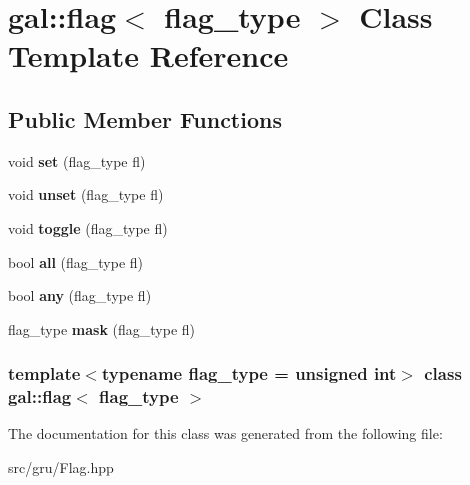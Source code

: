 \hypertarget{classgal_1_1flag}{\section{gal\-:\-:flag$<$ flag\-\_\-type $>$ \-Class \-Template \-Reference}
\label{classgal_1_1flag}
}
\subsection*{\-Public \-Member \-Functions}
\begin{DoxyCompactItemize}
\item 
\hypertarget{classgal_1_1flag_a15547f1ab906e6f2ce8d0f39cfd04176}{void {\bfseries set} (flag\-\_\-type fl)}\label{classgal_1_1flag_a15547f1ab906e6f2ce8d0f39cfd04176}

\item 
\hypertarget{classgal_1_1flag_ad1b12cce504346f9653b3942294bf49a}{void {\bfseries unset} (flag\-\_\-type fl)}\label{classgal_1_1flag_ad1b12cce504346f9653b3942294bf49a}

\item 
\hypertarget{classgal_1_1flag_a0f1b53ccd1537f6e39963fac972fb3ea}{void {\bfseries toggle} (flag\-\_\-type fl)}\label{classgal_1_1flag_a0f1b53ccd1537f6e39963fac972fb3ea}

\item 
\hypertarget{classgal_1_1flag_a4d088d21d36671e9543b841401f5f36e}{bool {\bfseries all} (flag\-\_\-type fl)}\label{classgal_1_1flag_a4d088d21d36671e9543b841401f5f36e}

\item 
\hypertarget{classgal_1_1flag_a22bdaed53c48667a62b81ba1f816b784}{bool {\bfseries any} (flag\-\_\-type fl)}\label{classgal_1_1flag_a22bdaed53c48667a62b81ba1f816b784}

\item 
\hypertarget{classgal_1_1flag_a16bf19c0d8eccbb9aff4ac08cf1f7548}{flag\-\_\-type {\bfseries mask} (flag\-\_\-type fl)}\label{classgal_1_1flag_a16bf19c0d8eccbb9aff4ac08cf1f7548}

\end{DoxyCompactItemize}
\subsubsection*{template$<$typename flag\-\_\-type = unsigned int$>$ class gal\-::flag$<$ flag\-\_\-type $>$}



\-The documentation for this class was generated from the following file\-:\begin{DoxyCompactItemize}
\item 
src/gru/\-Flag.\-hpp\end{DoxyCompactItemize}
